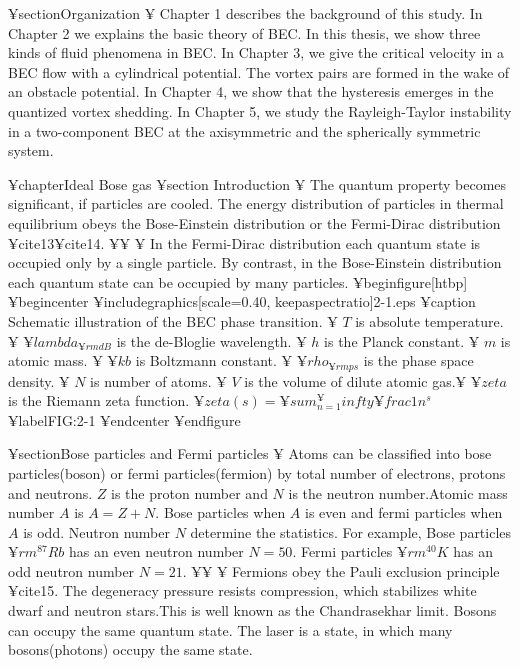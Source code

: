 ¥section{Organization}
¥ Chapter 1 describes the background of this study.
In Chapter 2 we explains the basic theory of BEC.
In this thesis, we show three kinds of fluid phenomena in BEC.
In Chapter 3, we give the critical velocity in a BEC flow with 
 a cylindrical potential. The vortex pairs are formed in the wake of an obstacle potential.
In Chapter 4, we show that the hysteresis emerges in the quantized vortex shedding.
In Chapter 5, we study the Rayleigh-Taylor instability in a two-component BEC at 
the axisymmetric and the spherically symmetric system.

¥chapter{Ideal Bose gas}
¥section {Introduction }
¥ The quantum property becomes significant, if particles are cooled.
The energy distribution of particles in thermal equilibrium obeys
the Bose-Einstein distribution or the Fermi-Dirac distribution ¥cite{13}¥cite{14}.
¥¥
¥ In the Fermi-Dirac distribution each quantum state is occupied only by a single particle.
By contrast, in the Bose-Einstein distribution each quantum state can be occupied by many particles.
¥begin{figure}[htbp]
¥begin{center}
¥includegraphics[scale=0.40, keepaspectratio]{2-1.eps}
¥caption{
Schematic illustration of the BEC phase transition. ¥ $T$ is absolute temperature.
¥ ${¥lambda_{¥rm dB}}$ is the de-Bloglie wavelength. ¥ $h$ is the Planck constant.
¥ $m$ is atomic mass.
¥ $¥kb$ is Boltzmann constant. ¥ $¥rho_{{¥rm ps}}$ is the phase space density.
¥ $N$ is number of atoms. ¥ $V$ is the volume of dilute atomic gas.¥ $¥zeta$ is the Riemann zeta function.
$¥zeta(s)=¥sum_{n=1}^¥infty ¥frac{1}{n^s}$
}
¥label{FIG:2-1}
¥end{center}
¥end{figure}

¥section{Bose particles and Fermi particles}
¥ Atoms can be classified into bose particles(boson) or fermi particles(fermion)
by total number of electrons, protons and neutrons.
$Z$ is the proton number and $N$ is the neutron number.Atomic mass number $A$ is
$A = Z + N$. Bose particles when $A$ is even and fermi particles when $A$ is odd.
Neutron number $N$ determine the statistics.
For example, Bose particles ${¥rm ^{87}Rb}$ has an even neutron number $N = 50$.
Fermi particles ${¥rm ^{40}K}$ has an odd neutron number $N = 21$.
¥¥
¥ Fermions obey the Pauli exclusion principle ¥cite{15}.
The degeneracy pressure resists compression, which stabilizes white dwarf
and neutron stars.This is well known as the Chandrasekhar limit.
Bosons can occupy the same quantum state. The laser is a state, in which many bosons(photons)
occupy the same state.

